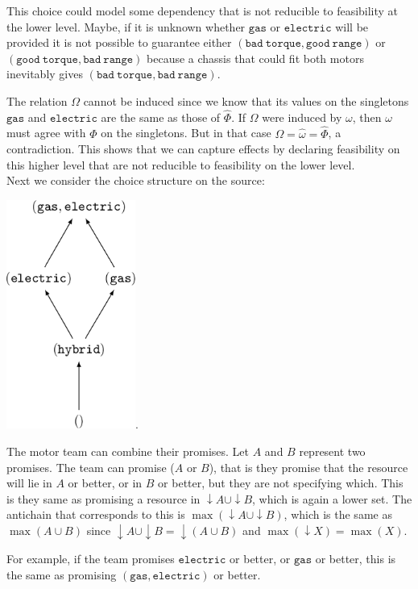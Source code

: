 \documentclass[12pt]{article}
\theoremstyle{definition}
\theoremstyle{plain}
\theoremstyle{plain}
\theoremstyle{plain}
\theoremstyle{plain}
\theoremstyle{remark}
\theoremstyle{remark}
\begin{document}
This choice could model some dependency that is not reducible to feasibility at the lower level. Maybe, if it is unknown whether $\mathtt{gas}$ or $\mathtt{electric}$ will be provided it is not possible to guarantee either $\mathtt{(bad\ torque, good\ range)}$ or $\mathtt{(good\ torque, bad\ range)}$ because a chassis that could fit both motors inevitably gives  $\mathtt{(bad\ torque, bad\ range)}$.

The relation $\Omega$ cannot be induced since we know that its values on the singletons $\mathtt{gas}$ and $\mathtt{electric}$ are the same as those of $\hat\Phi$. If $\Omega$ were induced by $\omega$, then $\omega$ must agree with $\Phi$ on the singletons. But in that case $\Omega = \hat\omega= \hat\Phi$, a contradiction. This shows that we can capture effects by declaring feasibility on this higher level that are not reducible to feasibility on the lower level.\\

Next we consider the choice structure on the source: 
\begin{center}
	\includegraphics[width=120pt]{section6/6.1/anti_motors.png}.
\end{center}
The motor team can combine their promises. Let $A$ and $B$ represent two promises. The team can promise ($A$ or $B$), that is they promise that the resource will lie in $A$ or better, or in $B$ or better, but they are not specifying which. This is they same as promising a resource in $\downarrow A \cup \downarrow B$, which is again a lower set. The antichain that corresponds to this is $\max(\downarrow A \cup \downarrow B)$, which is the same as $\max(A \cup B)$ since $\downarrow A \cup \downarrow B = \downarrow(A \cup B)$ and $\max(\downarrow X) = \max(X)$.

For example, if the team promises $\mathtt{electric}$ or better, or $\mathtt{gas}$ or better, this is the same as promising  $(\mathtt{gas},\mathtt{electric})$ or better.
\end{document}

